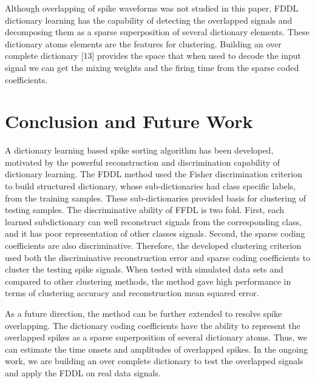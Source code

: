 \documentclass[conference]{IEEEtran}
\begin{document}
	Although overlapping of spike waveforms was not studied in this paper, FDDL dictionary learning has the capability of detecting the overlapped signals and decomposing them as a sparse superposition of several dictionary elements. These dictionary atoms elements are the features for clustering. Building an over complete dictionary [13] provides the space that when used to decode the input signal we can get the mixing weights and the firing time from the sparse coded coefficients.
	
	\section{Conclusion and Future Work}
	A dictionary learning based spike sorting algorithm has been developed, motivated by the powerful reconstruction and discrimination capability of dictionary learning. The FDDL method used the Fisher discrimination criterion to build structured dictionary, whose sub-dictionaries had class specific labels, from the training samples. These sub-dictionaries provided basis for clustering of testing samples. The discriminative ability of FFDL is two fold. First, each learned subdictionary can well reconstruct signals from the corresponding class, and it has poor representation of other classes signals. Second, the sparse coding coefficients are also discriminative. Therefore, the developed clustering criterion used both the discriminative reconstruction error and sparse coding coefficients to cluster the testing spike signals. When tested with simulated data sets and compared to other clustering methods, the method gave high performance in terms of clustering accuracy and reconstruction mean squared error.

	As a future direction, the method can be further extended to resolve spike overlapping. The dictionary coding coefficients have the ability to represent the overlapped spikes as a sparse superposition of several dictionary atoms. Thus, we can estimate the time onsets and amplitudes of overlapped spikes. In the ongoing work, we are building an over complete dictionary to test the overlapped signals and apply the FDDL on real data signals.
	
\end{document}
